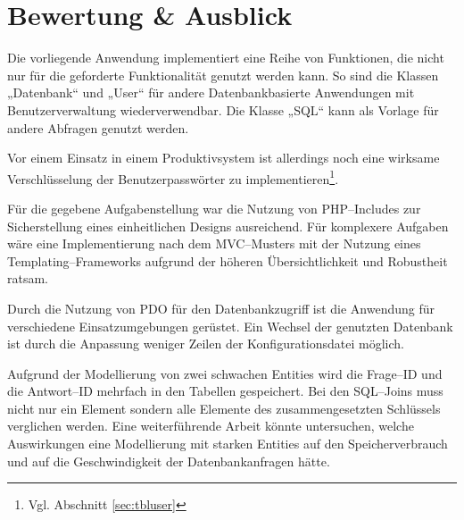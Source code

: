 \section{Bewertung \& Ausblick}

Die vorliegende Anwendung implementiert eine Reihe von Funktionen, die nicht nur für die geforderte Funktionalität genutzt werden kann. So sind die Klassen „Datenbank“ und „User“ für andere Datenbankbasierte Anwendungen mit Benutzerverwaltung wiederverwendbar. Die Klasse „SQL“ kann als Vorlage für andere Abfragen genutzt werden.

Vor einem Einsatz in einem Produktivsystem ist allerdings noch eine wirksame Verschlüsselung der Benutzerpasswörter zu implementieren\footnote{Vgl. Abschnitt \ref{sec:tbluser}}.

Für die gegebene Aufgabenstellung war die Nutzung von PHP--Includes zur Sicherstellung eines einheitlichen Designs ausreichend. Für komplexere Aufgaben wäre eine Implementierung nach dem MVC--Musters mit der Nutzung eines Temp\-lating--Frame\-works aufgrund der höheren Übersichtlichkeit und Robustheit ratsam.

Durch die Nutzung von PDO für den Datenbankzugriff ist die Anwendung für verschiedene Einsatzumgebungen gerüstet. Ein Wechsel der genutzten Datenbank ist durch die Anpassung weniger Zeilen der Konfigurationsdatei möglich.

Aufgrund der Modellierung von zwei schwachen Entities wird die Frage--ID und die Antwort--ID mehrfach in den Tabellen gespeichert. Bei den SQL--Joins muss nicht nur ein Element sondern alle Elemente des zusammengesetzten Schlüssels verglichen werden. Eine weiterführende Arbeit könnte untersuchen, welche Auswirkungen eine Modellierung mit starken Entities auf den Speicherverbrauch und auf die Geschwindigkeit der Datenbankanfragen hätte.
